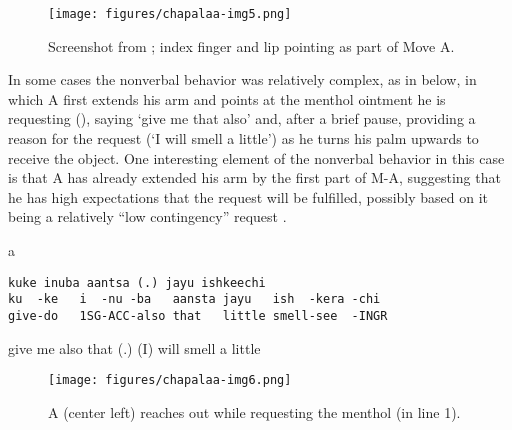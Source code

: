 \documentclass[output=paper]{langsci/langscibook}
\begin{document}
\begin{figure}
\caption{\label{fig:floyd:3} Screenshot from ; index finger and lip pointing as part of Move A.
}
\texttt{[image: figures/chapalaa-img5.png]}
\end{figure}

In some cases the nonverbal behavior was relatively complex, as in  below, in which A first extends his arm and points at the menthol ointment he is requesting (), saying ‘give me that also’ and, after a brief pause, providing a reason for the request (‘I will smell a little’) as he turns his palm upwards to receive the object. One interesting element of the nonverbal behavior in this case is that A has already extended his arm by the first part of M-A, suggesting that he has high expectations that the request will be fulfilled, possibly based on it being a relatively “low contingency” request \citep{CurlDrew2008,CravenPotter2010}.

\vspace{-1mm}
%
\begin{mdframednoverticalspace}[style=firstfoc]
\begin{transbox}{1}{a}
\begin{verbatim}
kuke inuba aantsa (.) jayu ishkeechi
ku  -ke   i  -nu -ba   aansta jayu   ish  -kera -chi
give-do   1SG-ACC-also that   little smell-see  -INGR
\end{verbatim}
give me also that (.) (I) will smell a little
\end{transbox}
\end{mdframednoverticalspace}
%
\vspace{-2mm}
%
\begin{mdframednoverticalspace}[style=secondfoc]
\end{mdframednoverticalspace}

\begin{figure}
\caption{\label{fig:floyd:4} A (center left) reaches out while requesting the menthol (in line 1). }
\texttt{[image: figures/chapalaa-img6.png]}
\end{figure}
\end{document}
